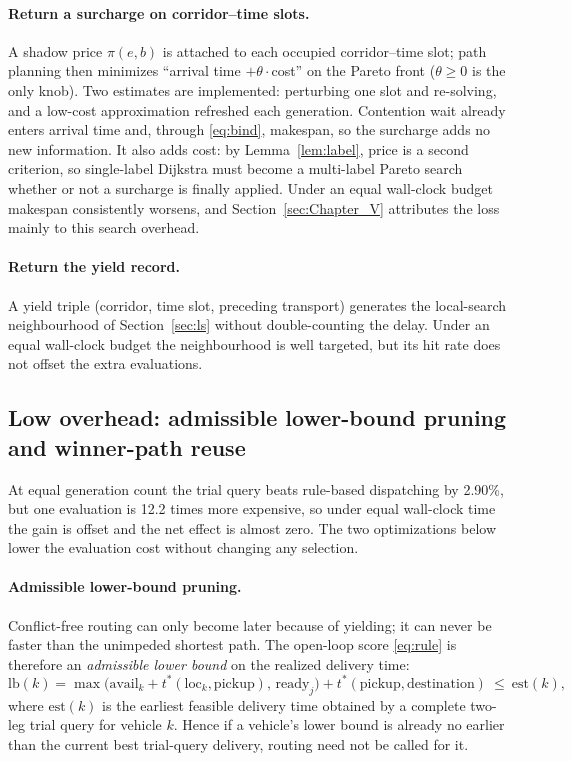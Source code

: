 \documentclass[manuscript,screen,review]{acmart}
\newcommand{\CostMultBefore}{12.2}
\newcommand{\GainProbeSameGen}{2.90\%}
\begin{document}
\paragraph{Return a surcharge on corridor--time slots.}
A shadow price $\pi(e,b)$ is attached to each occupied corridor--time slot; path planning then minimizes ``arrival time $+\theta\cdot$cost'' on the Pareto front ($\theta\ge0$ is the only knob).
Two estimates are implemented: perturbing one slot and re-solving, and a low-cost approximation refreshed each generation.
Contention wait already enters arrival time and, through \eqref{eq:bind}, makespan, so the surcharge adds no new information.
It also adds cost: by Lemma~\ref{lem:label}, price is a second criterion, so single-label Dijkstra must become a multi-label Pareto search whether or not a surcharge is finally applied.
Under an equal wall-clock budget makespan consistently worsens, and Section~\ref{sec:Chapter_V} attributes the loss mainly to this search overhead.

\paragraph{Return the yield record.}
A yield triple (corridor, time slot, preceding transport) generates the local-search neighbourhood of Section~\ref{sec:ls} without double-counting the delay.
Under an equal wall-clock budget the neighbourhood is well targeted, but its hit rate does not offset the extra evaluations.

\subsection{Low overhead: admissible lower-bound pruning and winner-path reuse}
\label{sec:speedup}

At equal generation count the trial query beats rule-based dispatching by \GainProbeSameGen{}, but one evaluation is \CostMultBefore{} times more expensive, so under equal wall-clock time the gain is offset and the net effect is almost zero.
The two optimizations below lower the evaluation cost without changing any selection.

\paragraph{Admissible lower-bound pruning.}
Conflict-free routing can only become later because of yielding; it can never be faster than the unimpeded shortest path.
The open-loop score \eqref{eq:rule} is therefore an \emph{admissible lower bound} on the realized delivery time:
\begin{equation}
\label{eq:lb_dispatch}
\mathrm{lb}(k)=\max\bigl(\mathrm{avail}_k+t^{*}(\mathrm{loc}_k,\text{pickup}),\,
\mathrm{ready}_j\bigr)+t^{*}(\text{pickup},\text{destination})\ \le\ \mathrm{est}(k),
\end{equation}
where $\mathrm{est}(k)$ is the earliest feasible delivery time obtained by a complete two-leg trial query for vehicle $k$.
Hence if a vehicle's lower bound is already no earlier than the current best trial-query delivery, routing need not be called for it.
\end{document}
